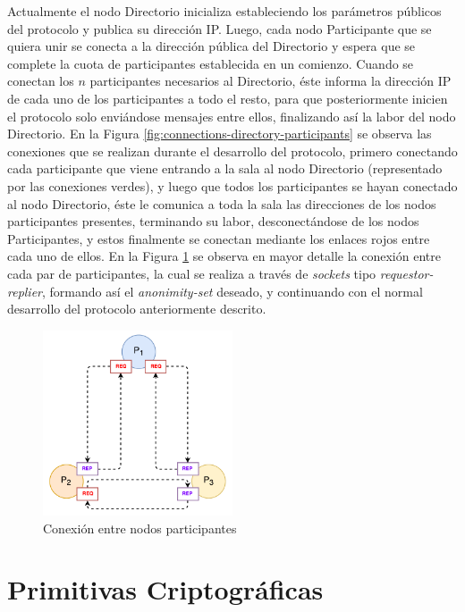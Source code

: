 Actualmente el nodo Directorio inicializa estableciendo los parámetros 
públicos del protocolo y publica su dirección IP. Luego, cada nodo 
Participante que se quiera unir se conecta a la dirección pública del 
Directorio y espera que se complete la cuota de participantes establecida en 
un comienzo. Cuando se conectan los $n$ participantes necesarios al Directorio, éste informa 
la dirección IP de cada uno de los participantes a todo el resto, para que 
posteriormente inicien el protocolo solo enviándose mensajes entre ellos, 
finalizando así la labor del nodo Directorio. En la Figura \ref{fig:connections-directory-participants} 
se observa las conexiones que se realizan durante el desarrollo del protocolo, 
primero conectando cada participante que viene entrando a la sala al nodo 
Directorio (representado por las conexiones verdes), y luego que todos los 
participantes se hayan conectado al nodo Directorio, éste le comunica a toda 
la sala las direcciones de los nodos participantes presentes, terminando su labor, 
desconectándose de los nodos Participantes, y estos finalmente se conectan mediante 
los enlaces rojos entre cada uno de ellos. En la Figura \ref{fig:connections-participants} 
se observa en mayor detalle la conexión entre cada par de participantes, la 
cual se realiza a través de \emph{sockets} tipo \emph{requestor-replier}, formando 
así el \emph{anonimity-set} deseado, y continuando con el normal desarrollo 
del protocolo anteriormente descrito.

\begin{figure}[H]
  \centering
    \includegraphics[width=0.5\textwidth]{imagenes/participants_connection.pdf}
  \caption{Conexión entre nodos participantes}
  \label{fig:connections-participants}
\end{figure}

\section{Primitivas Criptográficas}

